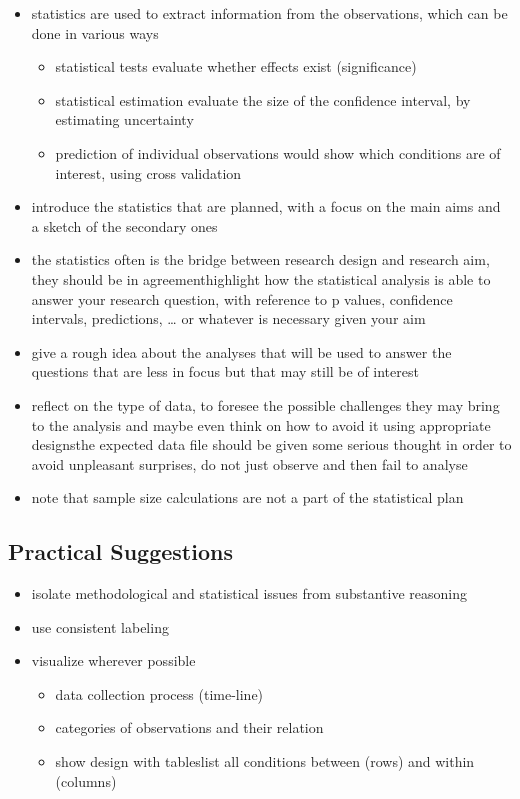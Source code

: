 \documentclass[]{article}
\providecommand{\tightlist}{%
  \setlength{\itemsep}{0pt}\setlength{\parskip}{0pt}}
\begin{document}
\begin{itemize}
\tightlist
\item
  statistics are used to extract information from the observations,
  which can be done in various ways

  \begin{itemize}
  \tightlist
  \item
    statistical tests evaluate whether effects exist (significance)
  \item
    statistical estimation evaluate the size of the confidence interval,
    by estimating uncertainty
  \item
    prediction of individual observations would show which conditions
    are of interest, using cross validation 
  \end{itemize}
\item
  introduce the statistics that are planned, with a focus on the main
  aims and a sketch of the secondary ones 
\item
  the statistics often is the bridge between research design and
  research aim, they should be in agreementhighlight how the statistical
  analysis is able to answer your research question, with reference to p
  values, confidence intervals, predictions, \ldots{} or whatever is
  necessary given your aim
\item
  give a rough idea about the analyses that will be used to answer the
  questions that are less in focus but that may still be of interest
\item
  reflect on the type of data, to foresee the possible challenges they
  may bring to the analysis and maybe even think on how to avoid it
  using appropriate designsthe expected data file should be given some
  serious thought in order to avoid unpleasant surprises, do not just
  observe and then fail to analyse 
\item
  note that sample size calculations are not a part of the statistical
  plan
\end{itemize}

\subsection{Practical Suggestions}\label{practical-suggestions}

\begin{itemize}
\tightlist
\item
  isolate methodological and statistical issues from substantive
  reasoning
\item
  use consistent labeling
\item
  visualize wherever possible

  \begin{itemize}
  \tightlist
  \item
    data collection process (time-line)
  \item
    categories of observations and their relation
  \item
    show design with tableslist all conditions between (rows) and within
    (columns)
  \end{itemize}
\end{itemize}
\end{document}
